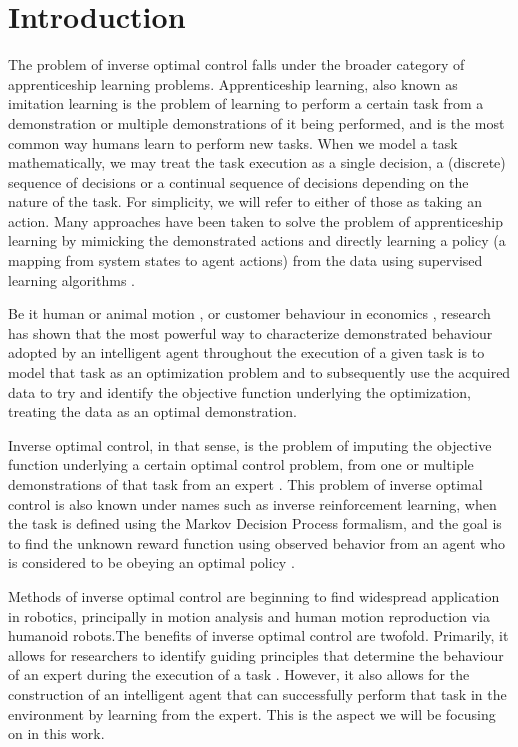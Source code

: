 \documentclass[12pt, a4paper]{article}
\begin{document}
\section{Introduction}
The problem of inverse optimal control falls under the broader category of apprenticeship learning problems. Apprenticeship learning, also known as imitation learning is the problem of learning to perform a certain task from a demonstration or multiple demonstrations of it being performed, and is the most common way humans learn to perform new tasks. When we model a task mathematically, we may treat the task execution as a single decision, a (discrete) sequence of decisions \cite{abbeel2004apprenticeship,ng2000algorithms} or a continual sequence of decisions \cite{mombaur2010human, johnson2013inverse} depending on the nature of the task. For simplicity, we will refer to either of those as taking an action. Many approaches have been taken to solve the problem of apprenticeship learning by mimicking the demonstrated actions and directly learning a policy (a mapping from system states to agent actions) from the data using supervised learning algorithms \cite{hayes1994robot, kuniyoshi1994learning, amit2002learning}.\par
Be it human or animal motion \cite{alexander1996optima, uno1989formation}, or customer behaviour in economics \cite{keeney1993decisions, sargent1978estimation}, research has shown that the most powerful way to characterize demonstrated behaviour adopted by an intelligent agent throughout the execution of a given task is to model that task as an optimization problem and to subsequently use the acquired data to try and identify the objective function underlying the optimization, treating the data as an optimal demonstration.\par
Inverse optimal control, in that sense, is the problem of imputing the objective function underlying a certain optimal control problem, from one or multiple demonstrations of that task from an expert \cite{keshavarz2011imputing}. This problem of inverse optimal control is also known under names such as inverse reinforcement learning, when the task is defined using the Markov Decision Process formalism, and the goal is to find the unknown reward function using observed behavior from an agent who is considered to be obeying an optimal policy \cite{abbeel2004apprenticeship, ng2000algorithms}.\par
Methods of inverse optimal control are beginning to find widespread application in robotics, principally in motion analysis and human motion reproduction via humanoid robots.The benefits of inverse optimal control are twofold. Primarily, it allows for researchers to identify guiding principles that determine the behaviour of an expert during the execution of a task \cite{oguz2018inverse, puydupin2012convex, sylla2014human}. However, it also allows for the construction of an intelligent agent that can successfully perform that task in the environment \cite{mombaur2010human} by learning from the expert. This is the aspect we will be focusing on in this work.\par
\end{document}
